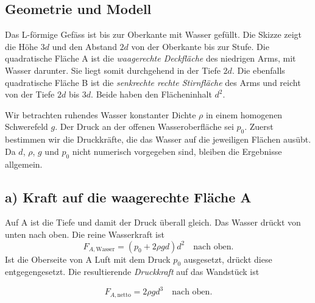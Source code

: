 
\subsection*{Geometrie und Modell}
Das L-förmige Gefäss ist bis zur Oberkante mit Wasser gefüllt. Die Skizze
zeigt die Höhe \(3d\) und den Abstand \(2d\) von der Oberkante bis zur Stufe.
Die quadratische Fläche A ist die \emph{waagerechte Deckfläche} des niedrigen
Arms, mit Wasser darunter. Sie liegt somit durchgehend in der Tiefe \(2d\).
Die ebenfalls quadratische Fläche B ist die \emph{senkrechte rechte
Stirnfläche} des Arms und reicht von der Tiefe \(2d\) bis \(3d\). Beide
haben den Flächeninhalt \(d^2\).

Wir betrachten ruhendes Wasser konstanter Dichte \(\rho\) in einem homogenen
Schwerefeld \(g\). Der Druck an der offenen Wasseroberfläche sei \(p_0\).
Zuerst bestimmen wir die Druckkräfte, die das Wasser auf die jeweiligen
Flächen ausübt. Da \(d\), \(\rho\), \(g\) und \(p_0\) nicht numerisch
vorgegeben sind, bleiben die Ergebnisse allgemein.

\subsection*{a) Kraft auf die waagerechte Fläche A}
Auf A ist die Tiefe und damit der Druck überall gleich. Das Wasser drückt von
unten nach oben. Die reine Wasserkraft ist
\begin{equation}
  F_{A,\mathrm{Wasser}}=(p_0+2\rho gd)d^2
  \quad\text{nach oben}.
\end{equation}
Ist die Oberseite von A Luft mit dem Druck \(p_0\) ausgesetzt, drückt diese
entgegengesetzt. Die resultierende \emph{Druckkraft} auf das Wandstück ist
\begin{ergebnis}
\begin{equation*}
  F_{A,\mathrm{netto}}=2\rho gd^3\quad\text{nach oben}.
\end{equation*}
\end{ergebnis}

